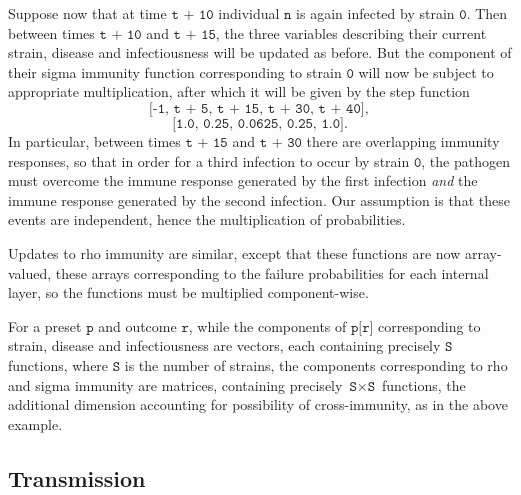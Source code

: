 \documentclass[10pt,letterpaper]{article}
\begin{document}
Suppose now that at time $\texttt{t + 10}$ individual $\texttt{n}$ is again infected by strain $\texttt{0}$. Then between times $\texttt{t + 10}$ and $\texttt{t + 15}$, the three variables describing their current strain, disease and infectiousness will be updated as before. But the component of their sigma immunity function corresponding to strain $\texttt{0}$ will now be subject to appropriate multiplication, after which it will be given by the step function $$\texttt{[-1, t + 5, t + 15, t + 30, t + 40]},$$ $$\texttt{[1.0, 0.25, 0.0625, 0.25, 1.0]}.$$ In particular, between times $\texttt{t + 15}$ and $\texttt{t + 30}$ there are overlapping immunity responses, so that in order for a third infection to occur by strain $\texttt{0}$, the pathogen must overcome the immune response generated by the first infection \textit{and} the immune response generated by the second infection. Our assumption is that these events are independent, hence the multiplication of probabilities.

Updates to rho immunity are similar, except that these functions are now array-valued, these arrays corresponding to the failure probabilities for each internal layer, so the functions must be multiplied component-wise.

For a preset $\texttt{p}$ and outcome $\texttt{r}$, while the components of $\texttt{p[r]}$ corresponding to strain, disease and infectiousness are vectors, each containing precisely $\texttt{S}$ functions, where $\texttt{S}$ is the number of strains, the components corresponding to rho and sigma immunity are matrices, containing precisely $\texttt{S} \times \texttt{S}$ functions, the additional dimension accounting for possibility of cross-immunity, as in the above example.

\subsection*{Transmission}
\end{document}
